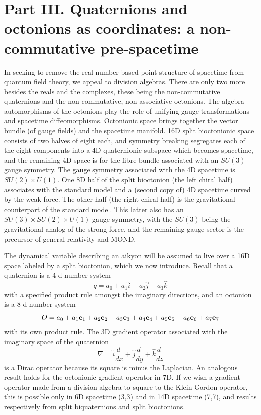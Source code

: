 \documentclass{iopconfser}
\begin{document}
\section{Part III. Quaternions and octonions as coordinates: a non-commutative pre-spacetime} 
In seeking to remove the real-number based point structure of spacetime from quantum field theory, we appeal to division algebras. There are only two more besides the reals and the complexes, these being the non-commutative quaternions and the non-commutative, non-associative octonions. The algebra automorphisms of the octonions play the role of unifying gauge transformations and spacetime diffeomorphisms. Octonionic space brings together the vector bundle (of gauge fields) and the spacetime manifold. 16D split bioctonionic space consists of two halves of eight each, and symmetry breaking segregates each of the eight components into a 4D quaternionic subspace which becomes spacetime, and the remaining 4D space is for the fibre bundle associated with an $SU(3)$ gauge symmetry. The gauge symmetry associated with the 4D spacetime is $SU(2) \times U(1)$. One 8D half of the split bioctonion (the left chiral half) associates with the standard model and a (second copy of) 4D spacetime curved by the weak force. The other half (the right chiral half) is the gravitational counterpart of the standard model. This latter also has an $SU(3) \times SU(2) \times U(1)$ gauge symmetry, with the $SU(3)$ being the gravitational analog of the strong force, and the remaining gauge sector is the precursor of general relativity and MOND.

The dynamical variable describing an aikyon will be assumed to live over a 16D space labeled by a split bioctonion, which we now introduce. Recall that a quaternion is a 4-d number system
\begin{equation}
q = a_0 + a_1 \hat i + a_2 \hat j + a_3 \hat k
\end{equation}
with a specified product rule amongst the imaginary directions, and an octonion is a 8-d number system
\begin{equation}
O = a_0 + a_1 {\bf e}_1 + a_2 {\bf e}_2 + a_3 {\bf e}_3 + a_4 {\bf e}_4 + a_5 {\bf e}_5 + a_6 {\bf e}_6 + a_7 {\bf e}_7
\end{equation}
with its own product rule. The 3D gradient operator associated with the imaginary space of the quaternion
\begin{equation}
\nabla= \hat{i}\frac{d\ }{dx} + \hat{j} \frac{d\ }{dy} + \hat{k} \frac{d\ }{dz}
\end{equation}
is a Dirac operator because its square is minus the Laplacian. An analogous result holds for the octonionic gradient operator in 7D. If we wish a gradient operator made from a division algebra to square to the Klein-Gordon operator, this is possible only in 6D spacetime (3,3) and in 14D spacetime (7,7), and results respectively from split biquaternions and split bioctonions.
\end{document}
